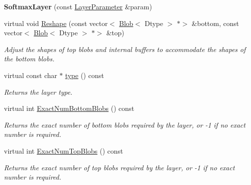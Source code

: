 \begin{DoxyCompactItemize}
\mbox{\label{classcaffe_1_1_softmax_layer_a6a3b60c74c2c48e8d5f65595ec1b4268}} 
{\bfseries Softmax\+Layer} (const \mbox{\hyperlink{classcaffe_1_1_layer_parameter}{Layer\+Parameter}} \&param)
\item 
virtual void \mbox{\hyperlink{classcaffe_1_1_softmax_layer_a503694b3161839de7c19d7d0af2cecc2}{Reshape}} (const vector$<$ \mbox{\hyperlink{classcaffe_1_1_blob}{Blob}}$<$ Dtype $>$ $\ast$$>$ \&bottom, const vector$<$ \mbox{\hyperlink{classcaffe_1_1_blob}{Blob}}$<$ Dtype $>$ $\ast$$>$ \&top)
\begin{DoxyCompactList}\small\item\em Adjust the shapes of top blobs and internal buffers to accommodate the shapes of the bottom blobs. \end{DoxyCompactList}\item 
\mbox{\label{classcaffe_1_1_softmax_layer_ab2481d025d184bff73c6ae5a5fa29ac1}} 
virtual const char $\ast$ \mbox{\hyperlink{classcaffe_1_1_softmax_layer_ab2481d025d184bff73c6ae5a5fa29ac1}{type}} () const
\begin{DoxyCompactList}\small\item\em Returns the layer type. \end{DoxyCompactList}\item 
virtual int \mbox{\hyperlink{classcaffe_1_1_softmax_layer_afe44488dde78e6bcf6d4bdad97ee4986}{Exact\+Num\+Bottom\+Blobs}} () const
\begin{DoxyCompactList}\small\item\em Returns the exact number of bottom blobs required by the layer, or -\/1 if no exact number is required. \end{DoxyCompactList}\item 
virtual int \mbox{\hyperlink{classcaffe_1_1_softmax_layer_a6bc4748c20e0940e5367ed4d50f4a11b}{Exact\+Num\+Top\+Blobs}} () const
\begin{DoxyCompactList}\small\item\em Returns the exact number of top blobs required by the layer, or -\/1 if no exact number is required. \end{DoxyCompactList}\end{DoxyCompactItemize}
